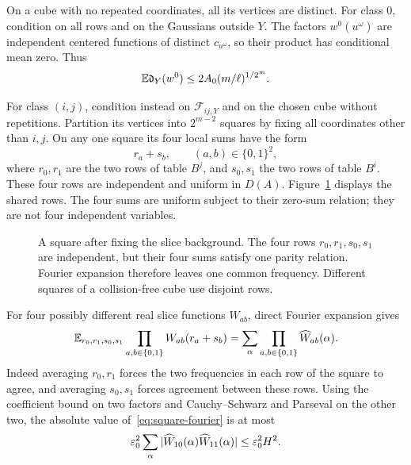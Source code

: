 On a cube with no repeated coordinates, all its vertices are distinct.
For class $0$, condition on all rows and on the Gaussians outside
$Y$. The factors $w^0(u^\omega)$ are independent centered functions
of distinct $c_{u^\omega}$, so their product has conditional mean
zero. Thus
\begin{equation}\label{eq:class-zero-correlation}
 \mathbb E\mathfrak d_Y(w^0)\le
 2A_0(m/\ell)^{1/2^m}.
\end{equation}

For class $(i,j)$, condition instead on $\mathcal F_{ij,Y}$ and on
the chosen cube without repetitions. Partition its vertices into
$2^{m-2}$ squares by fixing all coordinates other than $i,j$.
On any one square its four local sums have the form
\[
 r_a+s_b,\qquad (a,b)\in\{0,1\}^2,
\]
where $r_0,r_1$ are the two rows of table $B^j$, and $s_0,s_1$ the
two rows of table $B^i$. These four rows are independent and uniform
in $D(A)$. Figure~\ref{fig:square} displays the shared rows. The four sums are uniform subject to their zero-sum
relation; they are not four independent variables.

\begin{figure}[htbp]
\centering

\caption{A square after fixing the slice background. The four rows
$r_0,r_1,s_0,s_1$ are independent, but their four sums satisfy one parity
relation. Fourier expansion therefore leaves one common frequency.
Different squares of a collision-free cube use disjoint rows.}
\label{fig:square}
\end{figure}


For four possibly different real slice functions $W_{ab}$, direct
Fourier expansion gives
\begin{equation}\label{eq:square-fourier}
 \mathbb E_{r_0,r_1,s_0,s_1}
       \prod_{a,b\in\{0,1\}}W_{ab}(r_a+s_b)
 =\sum_\alpha\prod_{a,b\in\{0,1\}}\widehat W_{ab}(\alpha).
\end{equation}
Indeed averaging $r_0,r_1$ forces the two frequencies in each row
of the square to agree, and averaging $s_0,s_1$ forces agreement
between these rows. Using the coefficient bound on two factors and
Cauchy--Schwarz and Parseval on the other two, the absolute value
of~\eqref{eq:square-fourier} is at most
\begin{equation}\label{eq:square-bound}
 \varepsilon_0^2\sum_\alpha
       |\widehat W_{10}(\alpha)\widehat W_{11}(\alpha)|
 \le\varepsilon_0^2H^2.
\end{equation}


